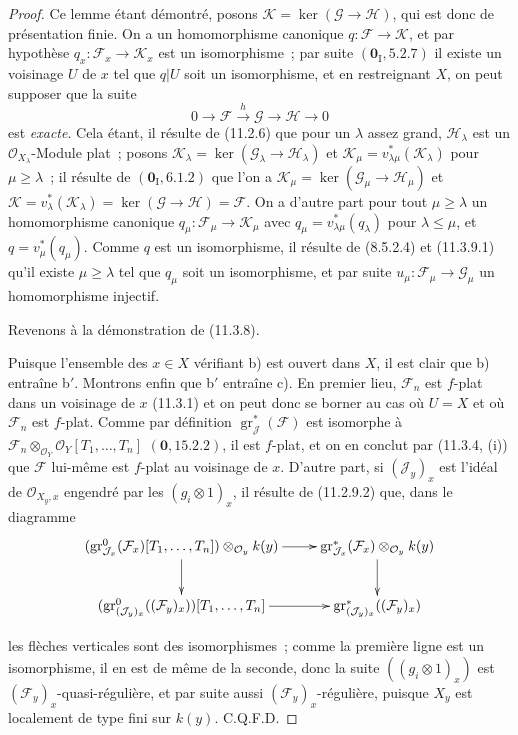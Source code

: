 \begin{proof}
Ce lemme étant démontré, posons $\mathcal K=\ker(\mathcal G\to\mathcal H)$,
qui est donc de présentation finie. On a un homomorphisme canonique
$q:\mathcal F\to\mathcal K$, et par hypothèse
$q_x:\mathcal F_x\to\mathcal K_x$ est un isomorphisme~; par suite
$(\mathbf 0_{\mathrm I},5.2.7)$ il existe un voisinage $U$ de $x$ tel que
$q|U$ soit un isomorphisme, et en restreignant $X$, on peut supposer que la
suite
\[
0\longrightarrow\mathcal F\xrightarrow{h}\mathcal G
\longrightarrow\mathcal H\longrightarrow0
\]
est \emph{exacte}. Cela étant, il résulte de (11.2.6) que pour un $\lambda$
assez grand, $\mathcal H_\lambda$ est un $\mathcal O_{X_\lambda}$-Module plat~;
posons $\mathcal K_\lambda=\ker(\mathcal G_\lambda\to\mathcal H_\lambda)$ et
$\mathcal K_\mu=v_{\lambda\mu}^*(\mathcal K_\lambda)$ pour $\mu\geq\lambda$~;
il résulte de $(\mathbf 0_{\mathrm I},6.1.2)$ que l'on a
$\mathcal K_\mu=\ker(\mathcal G_\mu\to\mathcal H_\mu)$ et
$\mathcal K=v_\lambda^*(\mathcal K_\lambda)
=\ker(\mathcal G\to\mathcal H)=\mathcal F$. On a d'autre part pour tout
$\mu\geq\lambda$ un homomorphisme canonique
$q_\mu:\mathcal F_\mu\to\mathcal K_\mu$ avec
$q_\mu=v_{\lambda\mu}^*(q_\lambda)$ pour $\lambda\leq\mu$, et
$q=v_\mu^*(q_\mu)$. Comme $q$ est un isomorphisme, il résulte de (8.5.2.4) et
(11.3.9.1) qu'il existe $\mu\geq\lambda$ tel que $q_\mu$ soit un isomorphisme,
et par suite $u_\mu:\mathcal F_\mu\to\mathcal G_\mu$ un homomorphisme
injectif.

Revenons à la démonstration de (11.3.8).

Puisque l'ensemble des $x\in X$ vérifiant b) est ouvert dans $X$, il est clair
que b) entraîne b$'$. Montrons enfin que b$'$ entraîne c). En premier lieu,
$\mathcal F_n$ est $f$-plat dans un voisinage de $x$ (11.3.1) et on peut donc
se borner au cas où $U=X$ et où $\mathcal F_n$ est $f$-plat. Comme par
définition $\operatorname{gr}_{\mathcal J}^*(\mathcal F)$ est isomorphe à
$\mathcal F_n\otimes_{\mathcal O_Y}\mathcal O_Y[T_1,\ldots,T_n]$
$(\mathbf 0,15.2.2)$, il est $f$-plat, et on en conclut par (11.3.4, (i)) que
$\mathcal F$ lui-même est $f$-plat au voisinage de $x$. D'autre part, si
$(\mathcal J_y)_x$ est l'idéal de $\mathcal O_{X_y,x}$ engendré par les
$(g_i\otimes1)_x$, il résulte de (11.2.9.2) que, dans le diagramme
\[
\xymatrix{
(\operatorname{gr}_{\mathcal J_x}^0(\mathcal F_x)[T_1,\ldots,T_n])
 \otimes_{\mathcal O_y}k(y) \ar[r] \ar[d] &
\operatorname{gr}_{\mathcal J_x}^*(\mathcal F_x)
 \otimes_{\mathcal O_y}k(y) \ar[d] \\
(\operatorname{gr}_{(\mathcal J_y)_x}^0((\mathcal F_y)_x))
 [T_1,\ldots,T_n] \ar[r] &
\operatorname{gr}_{(\mathcal J_y)_x}^*((\mathcal F_y)_x)
}
\]


les flèches verticales sont des isomorphismes~; comme la première ligne est un
isomorphisme, il en est de même de la seconde, donc la suite
$((g_i\otimes1)_x)$ est $(\mathcal F_y)_x$-quasi-régulière, et par suite aussi
$(\mathcal F_y)_x$-régulière, puisque $X_y$ est localement de type fini sur
$k(y)$. C.Q.F.D.
\end{proof}

